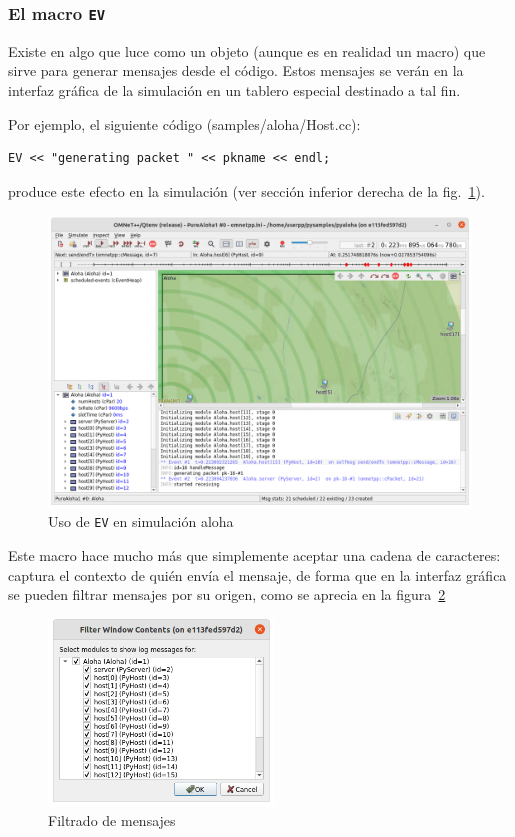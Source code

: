 \documentclass[]{article}
\begin{document}
\subsubsection{El macro \texttt{EV}}\label{subsec:ev}

Existe en \omnetpp{} algo que luce como un objeto (aunque es en realidad un macro)
que sirve para generar mensajes desde el código. Estos mensajes se verán en la
interfaz gráfica de la simulación en un tablero especial destinado a tal fin.

Por ejemplo, el siguiente código (samples/aloha/Host.cc):

\begin{verbatim}
EV << "generating packet " << pkname << endl;
\end{verbatim}

\noindent produce este efecto en la simulación (ver sección inferior derecha de
la fig.~\ref{fig:aloha_EV}).

\begin{figure}[h]
\caption{Uso de \texttt{EV} en simulación aloha}
\label{fig:aloha_EV}
\centering
\includegraphics[width=\textwidth]{aloha_EV}
\end{figure}

Este macro hace mucho más que simplemente aceptar una cadena de caracteres:
captura el contexto de quién envía el mensaje, de forma que en la interfaz
gráfica se pueden filtrar mensajes por su origen, como se aprecia en la
figura~\ref{fig:aloha_filter}

\begin{figure}[h]
\caption{Filtrado de mensajes}
\label{fig:aloha_filter}
\centering
\includegraphics[width=6cm]{aloha_filter}
\end{figure}
\end{document}
